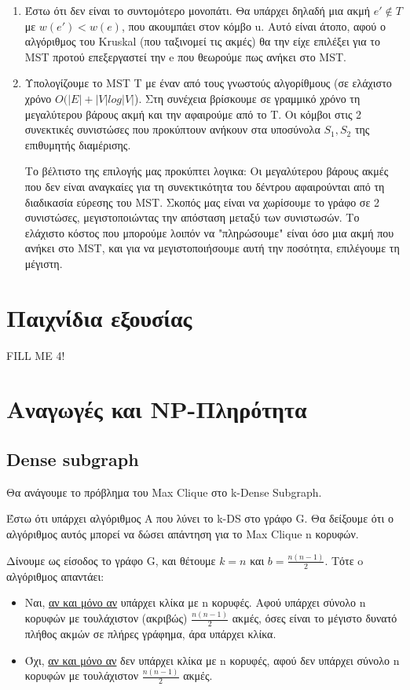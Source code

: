 \documentclass[a4paper,11pt]{article}
\begin{document}
\begin{enumerate}
\item Έστω ότι δεν είναι το συντομότερο μονοπάτι. Θα υπάρχει δηλαδή μια ακμή
$e' \notin T$ με $w(e') < w(e)$, που ακουμπάει στον κόμβο u. Αυτό είναι άτοπο,
αφού ο αλγόριθμος του Kruskal (που ταξινομεί τις ακμές) θα την είχε επιλέξει
για το MST προτού επεξεργαστεί την e που θεωρούμε πως ανήκει στο MST.
\item Υπολογίζουμε το MST T με έναν από τους γνωστούς αλγορίθμους (σε ελάχιστο
χρόνο $O(|E| + |V|log|V|$). Στη συνέχεια βρίσκουμε σε γραμμικό χρόνο τη
μεγαλύτερου βάρους ακμή και την αφαιρούμε από το T. Οι κόμβοι στις 2
συνεκτικές συνιστώσες που προκύπτουν ανήκουν στα υποσύνολα $S_1, S_2$ της
επιθυμητής διαμέρισης.

Το βέλτιστο της επιλογής μας προκύπτει λογικα: Οι μεγαλύτερου βάρους ακμές που
δεν είναι αναγκαίες για τη συνεκτικότητα του δέντρου αφαιρούνται από τη
διαδικασία εύρεσης του MST. Σκοπός μας είναι να χωρίσουμε το γράφο σε 2
συνιστώσες, μεγιστοποιώντας την απόσταση μεταξύ των συνιστωσών. Το ελάχιστο
κόστος που μπορούμε λοιπόν να "πληρώσουμε" είναι όσο μια ακμή που ανήκει στο
MST, και για να μεγιστοποιήσουμε αυτή την ποσότητα, επιλέγουμε τη μέγιστη.
\end{enumerate}


\section{Παιχνίδια εξουσίας}
FILL ME 4!


\section{Αναγωγές και NP-Πληρότητα}
\subsection{Dense subgraph}
Θα ανάγουμε το πρόβλημα του Max Clique στο k-Dense Subgraph.

Έστω ότι υπάρχει αλγόριθμος Α που λύνει το k-DS στο γράφο G.
Θα δείξουμε ότι ο αλγόριθμος αυτός μπορεί να δώσει απάντηση για το Max Clique
n κορυφών.

Δίνουμε ως είσοδος το γράφο G, και θέτουμε $k = n$ και $b = \frac{n(n-1)}{2}$.
Τότε o αλγόριθμος απαντάει:
\begin{itemize}
\item Ναι, \underline{αν και μόνο αν} υπάρχει κλίκα με n κορυφές. Αφού υπάρχει
σύνολο n κορυφών με τουλάχιστον (ακριβώς) $\frac{n(n-1)}{2}$ ακμές, όσες είναι
το μέγιστο δυνατό πλήθος ακμών σε πλήρες γράφημα, άρα υπάρχει κλίκα.
\item Όχι, \underline{αν και μόνο αν} δεν υπάρχει κλίκα με n κορυφές, αφού δεν
υπάρχει σύνολο n κορυφών με τουλάχιστον $\frac{n(n-1)}{2}$ ακμές.
\end{itemize}
\end{document}
